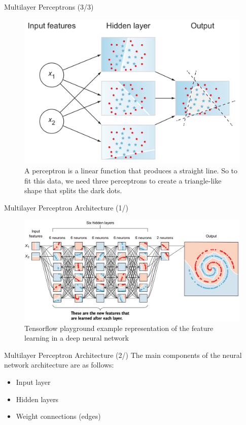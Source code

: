 \documentclass{beamer}
\begin{document}
\begin{frame}{Multilayer Perceptrons (3/3)}
	\begin{figure}[ht]
		\centering
		\includegraphics[scale=0.225]{images/multilayer-perceptrons}
		\caption{A perceptron is a linear function that produces a straight line. So to fit this data, we need three perceptrons to create a triangle-like shape that splits the dark dots.}
	\end{figure}					
\end{frame}

\begin{frame}{Multilayer Perceptron Architecture (1/)}
	\begin{figure}[ht]
		\centering
		\includegraphics[scale=0.18]{images/tensorflow-playground}
		\caption{Tensorflow playground example representation of the feature learning in a deep neural network}
	\end{figure}					
\end{frame}

\begin{frame}{Multilayer Perceptron Architecture (2/)}
	The main components of the neural network architecture are as follows:
	\begin{itemize}
		\item<2-> Input layer
		\item<3-> Hidden layers
		\item<4-> Weight connections (edges) 
	\end{itemize}
\end{frame}
\end{document}
